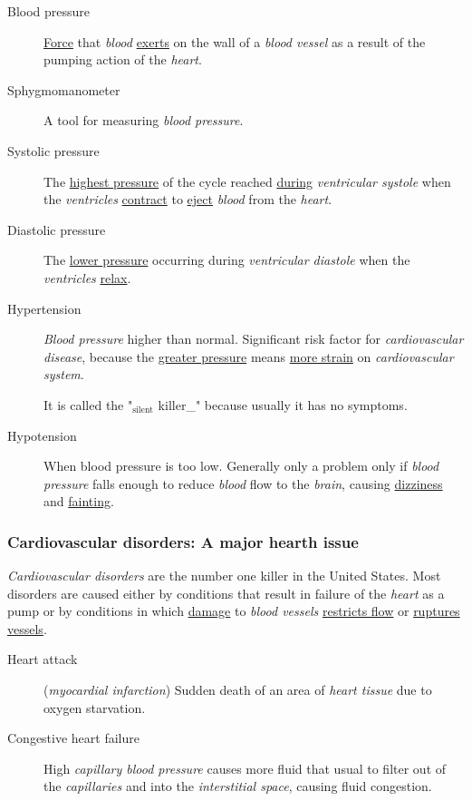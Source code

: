 \documentclass[11pt]{article}
\begin{document}
\begin{description}
\item[{Blood pressure}] \uline{Force} that \emph{blood} \uline{exerts} on the wall of a \emph{blood vessel} as
a result of the pumping action of the \emph{heart}.
\item[{Sphygmomanometer}] A tool for measuring \emph{blood pressure}.
\item[{Systolic pressure}] The \uline{highest pressure} of the cycle reached \uline{during}
\emph{ventricular systole} when the \emph{ventricles} \uline{contract} to \uline{eject} \emph{blood} from
the \emph{heart}.
\item[{Diastolic pressure}] The \uline{lower pressure} occurring during \emph{ventricular
diastole} when the \emph{ventricles} \uline{relax}.
\item[{Hypertension}] \emph{Blood pressure} higher than normal. Significant risk factor
for \emph{cardiovascular disease}, because the \uline{greater pressure} means \uline{more
strain} on \emph{cardiovascular system}.

It is called the "\(_{\text{silent}}\) killer\_" because usually it has no symptoms.
\item[{Hypotension}] When blood pressure is too low. Generally only a problem
only if \emph{blood pressure} falls enough to reduce \emph{blood} flow to the \emph{brain},
causing \uline{dizziness} and \uline{fainting}.
\end{description}

\subsubsection{Cardiovascular disorders: A major hearth issue}
\label{sec:org0c3907f}
\emph{Cardiovascular disorders} are the number one killer in the United States.
Most disorders are caused either by conditions that result in failure of the
\emph{heart} as a pump or by conditions in which \uline{damage} to \emph{blood vessels} \uline{restricts
flow} or \uline{ruptures vessels}.

\begin{description}
\item[{Heart attack}] (\emph{myocardial infarction}) Sudden death of an area of \emph{heart
tissue} due to oxygen starvation.
\item[{Congestive heart failure}] High \emph{capillary blood pressure} causes more
fluid that usual to filter out of the \emph{capillaries} and into the
\emph{interstitial space}, causing fluid congestion.
\end{description}
\end{document}
